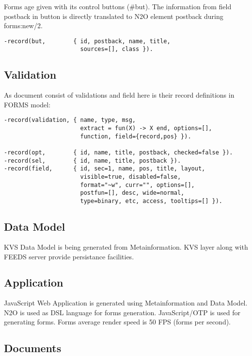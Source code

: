 Forms age given with its control buttons (#but).
The information from field postback in button is directly translated
to N2O element postback during forms:new/2.

\vspace{1\baselineskip}
\begin{lstlisting}
-record(but,        { id, postback, name, title,
                      sources=[], class }).
\end{lstlisting}

\subsection{Validation}
As document consist of validations and field here is their
record definitions in FORMS model:

\vspace{1\baselineskip}
\begin{lstlisting}
-record(validation, { name, type, msg,
                      extract = fun(X) -> X end, options=[],
                      function, field={record,pos} }).

-record(opt,        { id, name, title, postback, checked=false }).
-record(sel,        { id, name, title, postback }).
-record(field,      { id, sec=1, name, pos, title, layout,
                      visible=true, disabled=false,
                      format="~w", curr="", options=[],
                      postfun=[], desc, wide=normal,
                      type=binary, etc, access, tooltips=[] }).
\end{lstlisting}

\subsection{Data Model}
KVS Data Model is being generated from Metainformation.
KVS layer along with FEEDS server provide persistance facilities.

\subsection{Application}
JavaScript Web Application is generated using Metainformation and Data Model.
N2O is used as DSL language for forms generation.
JavaScript/OTP is used for generating forms.
Forms average render speed is 50 FPS (forms per second).

\subsection{Documents}

